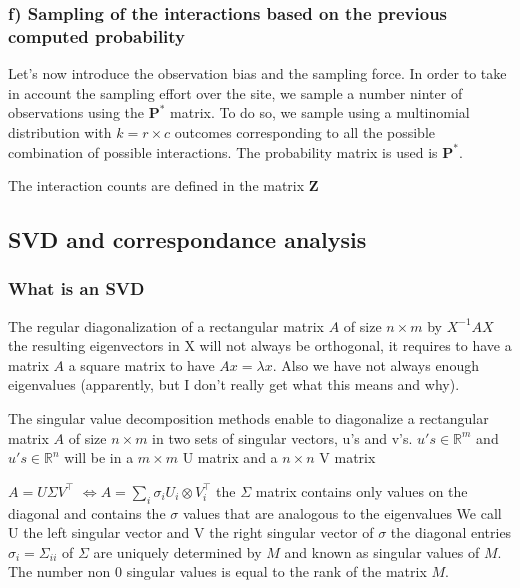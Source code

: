 \documentclass{article}
\begin{document}
\subsubsection{f) Sampling of the interactions based on the previous computed probability}
Let's now introduce the observation bias and the sampling force. In order to take in account the sampling effort over the site, we sample a number ninter of observations using the $\textbf{P}^*$ matrix. To do so, we sample using a multinomial distribution with $k = r \times c$ outcomes corresponding to all the possible combination of possible interactions. The probability matrix is used is $\textbf{P}^*$.

The interaction counts are defined in the matrix $\textbf{Z}$











\subsection{SVD and correspondance analysis}

\subsubsection{What is an SVD}

The regular diagonalization of a rectangular matrix $A$ of size $n \times m$ by $X^{-1} AX$ the resulting eigenvectors in X will not always be orthogonal, it requires to have a matrix $A$ a square matrix to have $Ax = \lambda x$. Also we have not always enough eigenvalues (apparently, but I don't really get what this means and why).

The singular value decomposition methods enable to diagonalize a rectangular matrix $A$ of size $n \times m$ in two sets of singular vectors, u's and v's. 
$u's \in \mathbb{R}^m$ and $u's \in \mathbb{R}^n$ will be in a $m \times m$ U matrix and a $n \times n$ V matrix

$A = U \Sigma V^\intercal$
$\Leftrightarrow A = \sum_i \sigma_i U_i \otimes V_i^\intercal$
the  $\Sigma$ matrix contains only values on the diagonal and contains the $\sigma$ values that are analogous to the eigenvalues 
We call U the left singular vector and V the right singular vector of $\sigma$
the diagonal entries $\sigma_i = \Sigma_{ii}$ of $\Sigma$ are uniquely determined by $M$ and known as singular values of $M$. The number non 0 singular values is equal to the rank of the matrix $M$.
\end{document}
